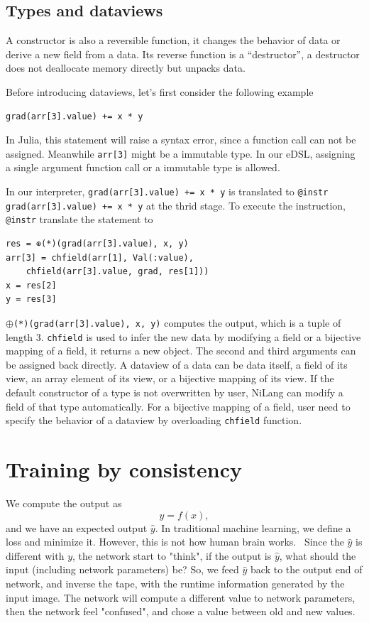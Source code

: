 \documentclass[aps,twocolumn,longbibliography,english,superscriptaddress,prr]{revtex4-1}
\newcommand{\<}{\langle}
\renewcommand{\>}{\rangle}
\theoremstyle{definition}\newtheorem{definition}{\textit{Definition}}
\begin{document}
\subsection{Types and dataviews}
A constructor is also a reversible function, it changes the behavior of data or derive a new field from a data.
Its reverse function is a ``destructor'', a destructor does not deallocate memory directly but unpacks data.

Before introducing dataviews, let's first consider the following example
\begin{minipage}{.44\textwidth}
\begin{lstlisting}
grad(arr[3].value) += x * y
\end{lstlisting}
\end{minipage}
In Julia, this statement will raise a syntax error, since a function call can not be assigned.
Meanwhile \texttt{arr[3]} might be a immutable type.
In our eDSL, assigning a single argument function call or a immutable type is allowed.

In our interpreter, \texttt{grad(arr[3].value) += x * y} is translated to \texttt{@instr grad(arr[3].value) += x * y} at the thrid stage.
To execute the instruction, \texttt{@instr} translate the statement to
\begin{minipage}{.44\textwidth}
\begin{lstlisting}
res = ⊕(*)(grad(arr[3].value), x, y)
arr[3] = chfield(arr[1], Val(:value), 
    chfield(arr[3].value, grad, res[1]))
x = res[2]
y = res[3]
\end{lstlisting}
\end{minipage}
\texttt{$\oplus$(*)(grad(arr[3].value), x, y)} computes the output, which is a tuple of length $3$.
\texttt{chfield} is used to infer the new data by modifying a field or a bijective mapping of a field, it returns a new object.
The second and third arguments can be assigned back directly.
A dataview of a data can be data itself, a field of its view, an array element of its view, or a bijective mapping of its view.
If the default constructor of a type is not overwritten by user, NiLang can modify a field of that type automatically.
For a bijective mapping of a field, user need to specify the behavior of a dataview by overloading \texttt{chfield} function.

\section{Training by consistency}\label{sec:train}
We compute the output as
\begin{equation}
    y = f(x),
\end{equation}
and we have an expected output $\hat{y}$. In traditional machine learning, we define a loss and minimize it. However, this is not how human brain works.~\cite{Hintoncomment}
Since the $\hat{y}$ is different with $y$, the network start to "think", if the output is $\hat{y}$, what should the input (including network parameters) be?
So, we feed $\hat{y}$ back to the output end of network, and inverse the tape, with the runtime information generated by the input image. The network will compute a different value to network parameters, then the network feel "confused", and chose a value between old and new values.
\end{document}
